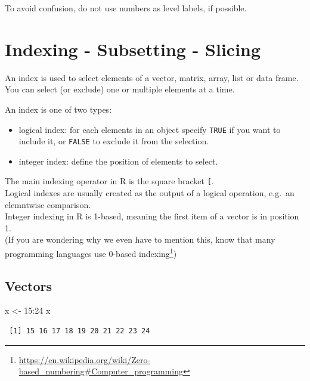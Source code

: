\documentclass[
]{book}
\newenvironment{Shaded}{\begin{snugshade}}{\end{snugshade}}
\newcommand{\DecValTok}[1]{\textcolor[rgb]{0.00,0.00,0.81}{#1}}
\newcommand{\NormalTok}[1]{#1}
\newcommand{\OtherTok}[1]{\textcolor[rgb]{0.56,0.35,0.01}{#1}}
\newcommand{\SpecialCharTok}[1]{\textcolor[rgb]{0.00,0.00,0.00}{#1}}
\DeclareRobustCommand{\href}[2]{#2\footnote{\url{#1}}}
\providecommand{\tightlist}{%
  \setlength{\itemsep}{0pt}\setlength{\parskip}{0pt}}
\begin{document}
\begin{rmdnote}
To avoid confusion, do not use numbers as level labels, if possible.
\end{rmdnote}

\hypertarget{indexing}{%
\chapter{Indexing - Subsetting - Slicing}\label{indexing}}

An index is used to select elements of a vector, matrix, array, list or data frame.\\
You can select (or exclude) one or multiple elements at a time.

An index is one of two types:

\begin{itemize}
\tightlist
\item
  logical index: for each elements in an object specify \texttt{TRUE} if you want to include it, or \texttt{FALSE} to exclude it from the selection.
\item
  integer index: define the position of elements to select.
\end{itemize}

The main indexing operator in R is the square bracket \texttt{{[}}.\\
Logical indexes are usually created as the output of a logical operation, e.g.~an elemntwise comparison.\\
Integer indexing in R is 1-based, meaning the first item of a vector is in position 1.\\
(If you are wondering why we even have to mention this, know that many programming languages use \href{https://en.wikipedia.org/wiki/Zero-based_numbering\#Computer_programming}{0-based indexing})

\hypertarget{indexvectors}{%
\section{Vectors}\label{indexvectors}}

\begin{Shaded}
\begin{Highlighting}[]
\NormalTok{x }\OtherTok{\textless{}{-}} \DecValTok{15}\SpecialCharTok{:}\DecValTok{24}
\NormalTok{x}
\end{Highlighting}
\end{Shaded}

\begin{verbatim}
 [1] 15 16 17 18 19 20 21 22 23 24
\end{verbatim}
\end{document}
